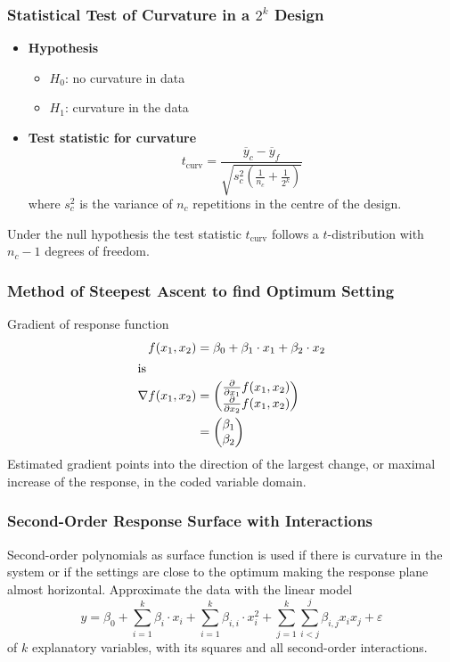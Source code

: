 \documentclass[11pt]{article}
\theoremstyle{definition}
\newcommand*\samplemean[1]{\overline{#1}}
\begin{document}
\subsubsection{Statistical Test of Curvature in a $2^k$ Design}
\begin{itemize}[leftmargin=*,label=]
	\item \textbf{Hypothesis}
	\begin{itemize}
		\item $H_0$: no curvature in data
		\item $H_1$: curvature in the data
	\end{itemize}
	\item \textbf{Test statistic for curvature}
	\begin{equation*}
		t_{\text{curv}} = \frac{\samplemean{y}_c - \samplemean{y}_f}{\sqrt{s_c^2\left(\frac{1}{n_c} + \frac{1}{2^k}\right)}}
	\end{equation*}
	where $s_c^2$ is the variance of $n_c$ repetitions in the centre of the design.
\end{itemize}

Under the null hypothesis the test statistic $t_{\text{curv}}$ follows a $t$-distribution with $n_c-1$ degrees of freedom.

\subsubsection{Method of Steepest Ascent to find Optimum Setting}
Gradient of response function
\begin{align*}
	f(x_1, x_2) &= \beta_0 + \beta_1\cdot x_1 + \beta_2\cdot x_2\\
	\intertext{is}
	\nabla f(x_1, x_2) &= \begin{pmatrix}
		\frac{\partial}{\partial x_1}f(x_1, x_2)\\
		\frac{\partial}{\partial x_2}f(x_1, x_2)
	\end{pmatrix}\\
	&= \begin{pmatrix}
		\beta_1\\
		\beta_2
	\end{pmatrix}
\end{align*}
Estimated gradient points into the direction of the largest change, or maximal increase of the response, in the coded variable domain.

\subsubsection{Second-Order Response Surface with Interactions}
Second-order polynomials as surface function is used if there is curvature in the system or if the settings are close to the optimum making the response plane almost horizontal. Approximate the data with the linear model
\begin{equation*}
	y = \beta_0 + \sum_{i=1}^k\beta_i\cdot x_i + \sum_{i=1}^{k}\beta_{i,i}\cdot x_i^2 + \sum_{j=1}^k\sum_{i<j}^j\beta_{i,j}x_i x_j + \varepsilon
\end{equation*}
of $k$ explanatory variables, with its squares and all second-order interactions.
\end{document}
